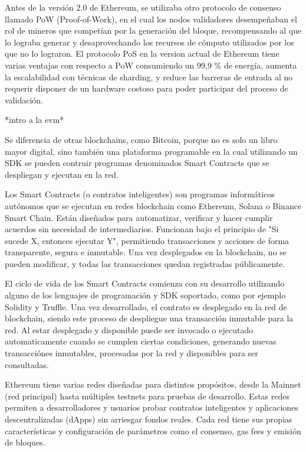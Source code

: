 Antes de la versión 2.0 de Ethereum, se utilizaba otro protocolo de consenso llamado PoW (Proof-of-Work), en el cual los nodos validadores desempeñaban el rol de mineros que competían por la generación del bloque, recompensando al que lo lograba generar y desaprovechando los recursos de cómputo utilizados por los que no lo lograron. El protocolo PoS en la version actual de Ethereum tiene varias ventajas con respecto a PoW consumiendo un 99,9 \% de energía, aumenta la escalabilidad con técnicas de sharding, y reduce las barreras de entrada al no requerir disponer de un hardware costoso para poder participar del proceso de validación.

*intro a la evm*

Se diferencia de otras blockchains, como Bitcoin, porque no es solo un libro mayor digital, sino también una plataforma programable en la cual utilizando un SDK se pueden contruir programas denominados Smart Contracts que se despliegan y ejecutan en la red.

Los Smart Contracts (o contratos inteligentes) son programas informáticos autónomos que se ejecutan en redes blockchain como Ethereum, Solana o Binance Smart Chain. Están diseñados para automatizar, verificar y hacer cumplir acuerdos sin necesidad de intermediarios. Funcionan bajo el principio de "Si sucede X, entonces ejecutar Y", permitiendo transacciones y acciones de forma transparente, segura e inmutable. Una vez desplegados en la blockchain, no se pueden modificar, y todas las transacciones quedan registradas públicamente. 

El ciclo de vida de los Smart Contracts comienza con su desarrollo utilizando alguno de los lenguajes de programación y SDK soportado, como por ejemplo Solidity y Truffle. Una vez desarrollado, el contrato es desplegado en la red de blockchain, siendo este proceso de despliegue una transacción inmutable para la red. Al estar desplegado y disponible puede ser invocado o ejecutado automaticamente cuando se cumplen ciertas condiciones, generando nuevas transacciónes inmutables, procesadas por la red y disponibles para ser consultadas.


Ethereum tiene varias redes diseñadas para distintos propósitos, desde la Mainnet (red principal) hasta múltiples testnets para pruebas de desarrollo. Estas redes permiten a desarrolladores y usuarios probar contratos inteligentes y aplicaciones descentralizadas (dApps) sin arriesgar fondos reales. Cada red tiene sus propias características y configuración de parámetros como el consenso, gas fees y emisión de bloques.


